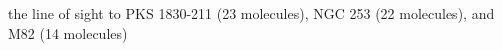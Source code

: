 the line of sight to PKS 1830-211 (23 molecules), NGC 253 (22 molecules), and M82 (14 molecules)\endinput